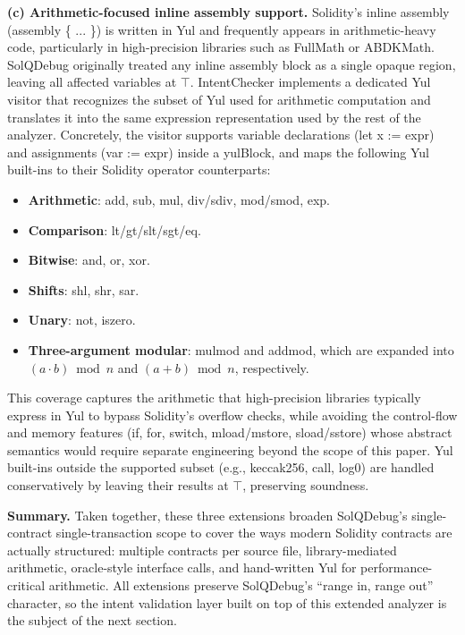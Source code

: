 \documentclass[pdflatex,sn-basic]{sn-jnl}%
\theoremstyle{thmstyleone}%
\theoremstyle{thmstyletwo}%
\theoremstyle{thmstylethree}%
\begin{document}
\smallskip
\noindent\textbf{(c) Arithmetic-focused inline assembly support.}
Solidity's inline assembly (assembly \{ ... \}) is written in Yul and frequently appears in arithmetic-heavy code, particularly in high-precision libraries such as FullMath or ABDKMath.
SolQDebug originally treated any inline assembly block as a single opaque region, leaving all affected variables at $\top$.
IntentChecker implements a dedicated Yul visitor that recognizes the subset of Yul used for arithmetic computation and translates it into the same expression representation used by the rest of the analyzer.
Concretely, the visitor supports variable declarations (let x := expr) and assignments (var := expr) inside a yulBlock, and maps the following Yul built-ins to their Solidity operator counterparts:
\begin{itemize}
    \item \textbf{Arithmetic}: add, sub, mul, div/sdiv, mod/smod, exp.
    \item \textbf{Comparison}: lt/gt/slt/sgt/eq.
    \item \textbf{Bitwise}: and, or, xor.
    \item \textbf{Shifts}: shl, shr, sar.
    \item \textbf{Unary}: not, iszero.
    \item \textbf{Three-argument modular}: mulmod and addmod, which are expanded into $(a \cdot b) \bmod n$ and $(a + b) \bmod n$, respectively.
\end{itemize}
This coverage captures the arithmetic that high-precision libraries typically express in Yul to bypass Solidity's overflow checks, while avoiding the control-flow and memory features (if, for, switch, mload/mstore, sload/sstore) whose abstract semantics would require separate engineering beyond the scope of this paper.
Yul built-ins outside the supported subset (e.g., keccak256, call, log0) are handled conservatively by leaving their results at $\top$, preserving soundness.

\smallskip
\noindent\textbf{Summary.}
Taken together, these three extensions broaden SolQDebug's single-contract single-transaction scope to cover the ways modern Solidity contracts are actually structured: multiple contracts per source file, library-mediated arithmetic, oracle-style interface calls, and hand-written Yul for performance-critical arithmetic.
All extensions preserve SolQDebug's ``range in, range out'' character, so the intent validation layer built on top of this extended analyzer is the subject of the next section.
\end{document}
